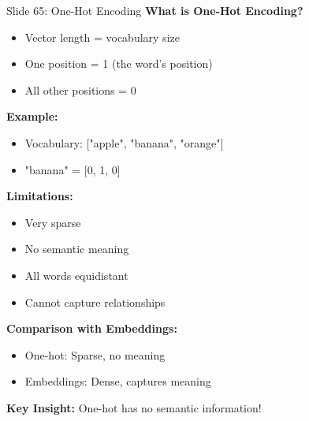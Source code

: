 \documentclass[8pt]{beamer}
\begin{document}
	\begin{frame}{Slide 65: One-Hot Encoding}
		\fontsize{6.5}{7.5}\selectfont
		\textbf{What is One-Hot Encoding?}
		\begin{itemize}
			\item Vector length = vocabulary size
			\item One position = 1 (the word's position)
			\item All other positions = 0
		\end{itemize}
		
		\vspace{0.1cm}
		\textbf{Example:}
		\begin{itemize}
			\item Vocabulary: ["apple", "banana", "orange"]
			\item "banana" = [0, 1, 0]
		\end{itemize}
		
		\vspace{0.1cm}
		\textbf{Limitations:}
		\begin{itemize}
			\item Very sparse
			\item No semantic meaning
			\item All words equidistant
			\item Cannot capture relationships
		\end{itemize}
		
		\vspace{0.1cm}
		\textbf{Comparison with Embeddings:}
		\begin{itemize}
			\item One-hot: Sparse, no meaning
			\item Embeddings: Dense, captures meaning
		\end{itemize}
		
		\textcolor{myblue}{\textbf{Key Insight:}} One-hot has no semantic information!
	\end{frame}
	
\end{document}
